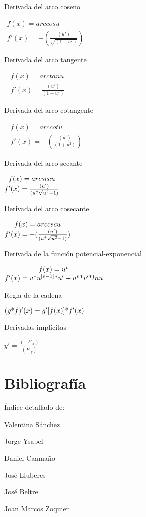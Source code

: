 \documentclass{article}
\newcommand\normalsubformula[1]{\text{\mathversion{normal}$#1$}}
\begin{document}
Derivada del arco coseno

 $\begin{matrix}f(x)=arccosu\\f'(x)=-(\frac{(u')}{\sqrt{(1-u^{2})}})\end{matrix}$

Derivada del arco tangente

\  $\begin{matrix}f(x)=arctanu\\f'(x)=\frac{(u')}{(1+u^{2})}\end{matrix}$

Derivada del arco cotangente

\  $\begin{matrix}f(x)=arccotu\\f'(x)=-(\frac{(u')}{(1+u^{2})})\end{matrix}$

Derivada del arco secante

 $\begin{matrix}f(x)=arcsecu\\f'(x)=\frac{(u')}{(u\normalsubformula{\text{*}}\sqrt{u^{2}}-1)}\end{matrix}$

Derivada del arco cosecante

 $\begin{matrix}f(x)=arccscu\\f'(x)=-(\frac{(u')}{(u\normalsubformula{\text{*}}\sqrt{u^{2}}-1)})\end{matrix}$

Derivada de la funci\'on potencial-exponencial

 $\begin{matrix}f(x)=u^{v}\\f'(x)=v\normalsubformula{\text{*}}u^{[v-1]}\normalsubformula{\text{*}}u'+u^{v}\normalsubformula{\text{*}}v'\normalsubformula{\text{*}}lnu\end{matrix}$

Regla de la cadena

 $(g\normalsubformula{\text{*}}f)'(x)=g'[f(x)]\normalsubformula{\text{*}}f'(x)$

Derivadas impl\'icitas

 $y'=\frac{(-F'_{x})}{(F'_{y})}$


\bigskip


\bigskip


\bigskip


\bigskip


\bigskip

\section[Bibliograf\'ia]{Bibliograf\'ia}

\bigskip

\'Indice detallado de:

Valentina S\'anchez

Jorge Ysabel

Daniel Caama\~no

Jos\'e Lluberes

Jos\'e Beltre

Joan Marcos Zoquier
\end{document}
